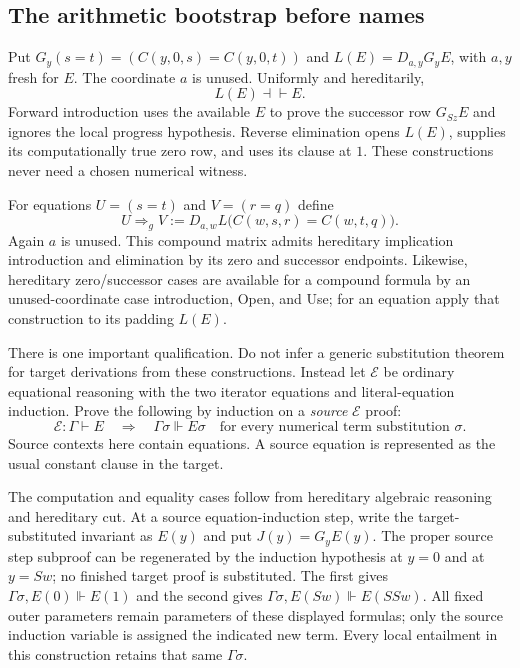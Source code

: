 \subsection{The arithmetic bootstrap before names}

Put $G_y(s=t)=(C(y,0,s)=C(y,0,t))$ and
$L(E)=D_{a,y}G_yE$, with $a,y$ fresh for $E$.
The coordinate $a$ is unused.  Uniformly and hereditarily,
\[
 L(E)\dashv\vdash E.
\]
Forward introduction uses the available $E$ to prove the successor row
$G_{Sz}E$ and ignores the local progress hypothesis.  Reverse elimination
opens $L(E)$, supplies its computationally true zero row, and uses its
clause at $1$.  These constructions never need a chosen numerical witness.

For equations $U=(s=t)$ and $V=(r=q)$ define
\[
 U\Rightarrow_g V
  :=D_{a,w}L\bigl(C(w,s,r)=C(w,t,q)\bigr).
\]
Again $a$ is unused.  This compound matrix admits hereditary implication
introduction and elimination by its zero and successor endpoints.
Likewise, hereditary zero/successor cases are available for a compound
formula by an unused-coordinate case introduction, Open, and Use; for an
equation apply that construction to its padding $L(E)$.

There is one important qualification.  Do not infer a generic substitution
theorem for target derivations from these constructions.  Instead let
$\mathcal E$ be ordinary equational reasoning with the two iterator
equations and literal-equation induction.  Prove the following by induction
on a \emph{source} $\mathcal E$ proof:
\[
 \mathcal E:\Gamma\vdash E
 \quad\Longrightarrow\quad
 \Gamma\sigma\Vdash E\sigma
 \quad\text{for every numerical term substitution }\sigma.
 \tag{E-embedding}
\]
Source contexts here contain equations.  A source equation is represented
as the usual constant clause in the target.

The computation and equality cases follow from hereditary algebraic
reasoning and hereditary cut.  At a source equation-induction step, write
the target-substituted invariant as $E(y)$ and put $J(y)=G_yE(y)$.
The proper source step subproof can be regenerated by the induction
hypothesis at $y=0$ and at $y=Sw$; no finished target proof is substituted.
The first gives $\Gamma\sigma,E(0)\Vdash E(1)$ and the second gives
$\Gamma\sigma,E(Sw)\Vdash E(SSw)$.  All fixed outer parameters remain
parameters of these displayed formulas; only the source induction variable
is assigned the indicated new term.  Every local entailment in this
construction retains that same $\Gamma\sigma$.

